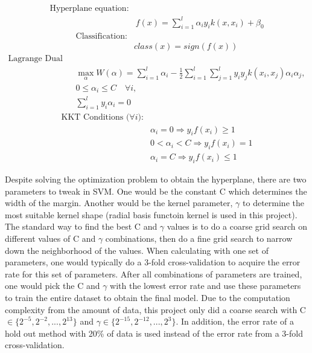 \documentclass[twoside]{article}
\begin{document}
\begin{align*}
\text{Hyperplane equation:}&\\
&f(x) = \sum\limits_{i=1}^{l}\alpha_iy_ik(x,x_i)+\beta_0
\end{align*}
\begin{align*}
\text{Classification:}&\\
&class(x) = sign(f(x))
\end{align*}
\begin{align*}
\text{Lagrange Dual Problem:}&\\
&\max\limits_{\alpha}^{}  W(\alpha) = \sum\limits_{i=1}^{l} \alpha_i-\frac{1}{2} \sum\limits_{i=1}^{l} \sum\limits_{j=1}^{l}y_iy_jk(x_i,x_j)\alpha_i\alpha_j,\\
&0\leq\alpha_i\leq C \quad \forall i,\\
&\sum\limits_{i=1}^{l}y_i\alpha_i=0
\end{align*}
\begin{align*}
\text{KKT Conditions (}\forall i\text{):}&\\
&\alpha_i=0\Rightarrow y_if(x_i) \geq 1\\
&0<\alpha_i<C\Rightarrow y_if(x_i) = 1\\
&\alpha_i=C\Rightarrow y_if(x_i) \leq 1
\end{align*}

Despite solving the optimization problem to obtain the hyperplane, there are two parameters to tweak in SVM. One would be the constant C which determines the width of the margin. Another would be the kernel parameter, $\gamma$ to determine the most suitable kernel shape (radial basis functoin kernel is used in this project). The standard way to find the best C and $\gamma$ values is to do a coarse grid search on different values of C and $\gamma$ combinations, then do a fine grid search to narrow down the neighborhood of the values. When calculating with one set of parameters, one would typically do a 3-fold cross-validation to acquire the error rate for this set of parameters. After all combinations of parameters are trained, one would pick the C and $\gamma$ with the lowest error rate and use these parameters to train the entire dataset to obtain the final model. Due to the computation complexity from the amount of data, this project only did a coarse search with C $\in \{2^{-5},2^{-2},...,2^{13}\}$ and $\gamma \in \{2^{-15}, 2^{-12},...,2^{3}\}$. In addition, the error rate of a hold out method with 20\% of data is used instead of the error rate from a 3-fold cross-validation.
\end{document}
